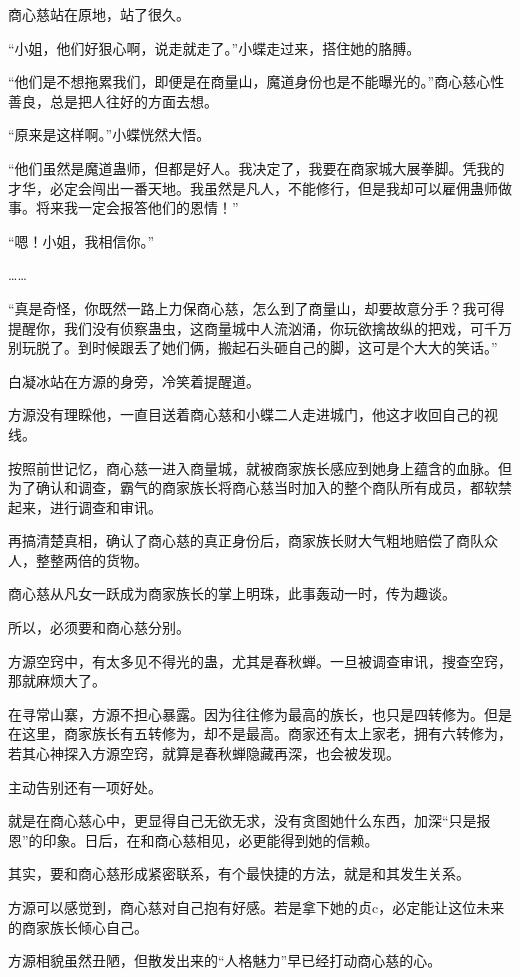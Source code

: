 \begin{this_body}
商心慈站在原地，站了很久。

“小姐，他们好狠心啊，说走就走了。”小蝶走过来，搭住她的胳膊。

“他们是不想拖累我们，即便是在商量山，魔道身份也是不能曝光的。”商心慈心性善良，总是把人往好的方面去想。

“原来是这样啊。”小蝶恍然大悟。

“他们虽然是魔道蛊师，但都是好人。我决定了，我要在商家城大展拳脚。凭我的才华，必定会闯出一番天地。我虽然是凡人，不能修行，但是我却可以雇佣蛊师做事。将来我一定会报答他们的恩情！”

“嗯！小姐，我相信你。”

……

“真是奇怪，你既然一路上力保商心慈，怎么到了商量山，却要故意分手？我可得提醒你，我们没有侦察蛊虫，这商量城中人流汹涌，你玩欲擒故纵的把戏，可千万别玩脱了。到时候跟丢了她们俩，搬起石头砸自己的脚，这可是个大大的笑话。”

白凝冰站在方源的身旁，冷笑着提醒道。

方源没有理睬他，一直目送着商心慈和小蝶二人走进城门，他这才收回自己的视线。

按照前世记忆，商心慈一进入商量城，就被商家族长感应到她身上蕴含的血脉。但为了确认和调查，霸气的商家族长将商心慈当时加入的整个商队所有成员，都软禁起来，进行调查和审讯。

再搞清楚真相，确认了商心慈的真正身份后，商家族长财大气粗地赔偿了商队众人，整整两倍的货物。

商心慈从凡女一跃成为商家族长的掌上明珠，此事轰动一时，传为趣谈。

所以，必须要和商心慈分别。

方源空窍中，有太多见不得光的蛊，尤其是春秋蝉。一旦被调查审讯，搜查空窍，那就麻烦大了。

在寻常山寨，方源不担心暴露。因为往往修为最高的族长，也只是四转修为。但是在这里，商家族长有五转修为，却不是最高。商家还有太上家老，拥有六转修为，若其心神探入方源空窍，就算是春秋蝉隐藏再深，也会被发现。

主动告别还有一项好处。

就是在商心慈心中，更显得自己无欲无求，没有贪图她什么东西，加深“只是报恩”的印象。日后，在和商心慈相见，必更能得到她的信赖。

其实，要和商心慈形成紧密联系，有个最快捷的方法，就是和其发生关系。

方源可以感觉到，商心慈对自己抱有好感。若是拿下她的贞c，必定能让这位未来的商家族长倾心自己。

方源相貌虽然丑陋，但散发出来的“人格魅力”早已经打动商心慈的心。


\end{this_body}
